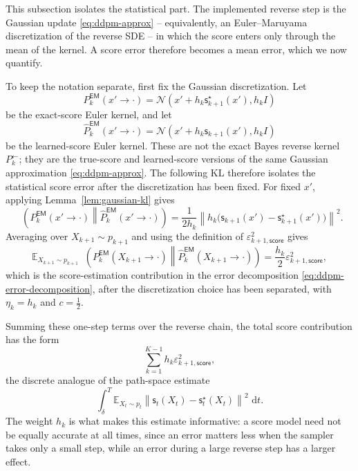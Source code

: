 \documentclass{amsart}
\numberwithin{equation}{section}
\theoremstyle{plain}
\theoremstyle{definition}
\theoremstyle{remark}
\DeclareMathOperator{\KL}{D_{\mathsf{KL}}}
\newcommand{\E}{\mathbb{E}}
\newcommand{\dd}{\,\mathrm{d}}
\newcommand{\Id}{I}
\newcommand{\wh}[1]{\widehat{#1}}
\newcommand{\eps}{\varepsilon}
\newcommand{\norm}[1]{\left\lVert #1 \right\rVert}
\newcommand{\sstar}{\mathsf{s}^{\star}}
\newcommand{\score}{\mathsf{s}}
\newcommand{\normal}[2]{\mathcal{N}\!\left(#1,#2\right)}
\begin{document}
This subsection isolates the statistical part.  The implemented reverse step is
the Gaussian update \eqref{eq:ddpm-approx} -- equivalently, an Euler--Maruyama
discretization of the reverse SDE -- in which the score enters only through the
mean of the kernel.  A score error therefore becomes a mean error, which we now
quantify.

To keep the notation separate, first fix the Gaussian discretization.  Let
\begin{equation}\label{eq:em-exact-score}
    P_k^{\mathsf{EM}}(x' \to \cdot)
    =
    \normal{x'+h_k\sstar_{k+1}(x')}{h_k\Id}
\end{equation}
be the exact-score Euler kernel, and let
\begin{equation}\label{eq:em-learned-score}
    \wh P_k^{\mathsf{EM}}(x' \to \cdot)
    =
    \normal{x'+h_k\score_{k+1}(x')}{h_k\Id}
\end{equation}
be the learned-score Euler kernel.  These are not the exact Bayes reverse
kernel $P_k^{\leftarrow}$; they are the true-score and learned-score versions of
the same Gaussian approximation \eqref{eq:ddpm-approx}.  The following KL
therefore isolates the statistical score error after the discretization has
been fixed.  For fixed $x'$, applying Lemma~\ref{lem:gaussian-kl} gives
\[
    \KL\!\left(
    P_k^{\mathsf{EM}}(x' \to \cdot)
    \middle\|
    \wh P_k^{\mathsf{EM}}(x' \to \cdot)
    \right)
    =
    \frac{1}{2h_k}
    \norm{h_k
    \bigl(\score_{k+1}(x')-\sstar_{k+1}(x')\bigr)}^2.
\]
Averaging over $X_{k+1}\sim p_{k+1}$ and using the definition of
$\eps_{k+1,\mathsf{score}}^2$ gives
\begin{equation}\label{eq:gaussian-score-step}
    \E_{X_{k+1}\sim p_{k+1}}
    \KL\!\left(
    P_k^{\mathsf{EM}}(X_{k+1} \to \cdot)
    \middle\|
    \wh P_k^{\mathsf{EM}}(X_{k+1} \to \cdot)
    \right)
    =
    \frac{h_k}{2}
    \eps_{k+1,\mathsf{score}}^2,
\end{equation}
which is the score-estimation contribution in the error decomposition
\eqref{eq:ddpm-error-decomposition}, after the discretization choice has been
separated, with $\eta_k=h_k$ and $c=\tfrac12$.

Summing these one-step terms over the reverse chain, the total score
contribution has the form
\begin{equation}\label{eq:score-sum}
    \sum_{k=1}^{K-1}h_k
    \eps_{k+1,\mathsf{score}}^2,
\end{equation}
the discrete analogue of the path-space estimate
\[
    \int_\delta^T
    \E_{X_t\sim p_t}
    \norm{\score_t(X_t)-\sstar_t(X_t)}^2
    \,\dd t.
\]
The weight $h_k$ is what makes this estimate informative: a score model need not
be equally accurate at all times, since an error matters less when the sampler
takes only a small step, while an error during a large reverse step has a larger
effect.
\end{document}

